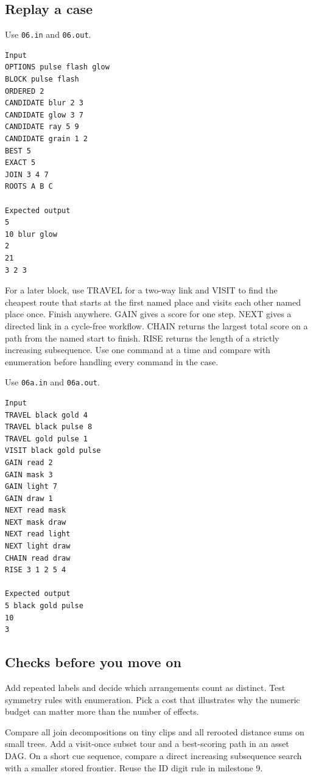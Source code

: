 \documentclass[11pt,letterpaper]{article}
\begin{document}
\subsection*{Replay a case}

Use \texttt{06.in} and \texttt{06.out}.

\begin{samepage}
\small
\begin{verbatim}
Input
OPTIONS pulse flash glow
BLOCK pulse flash
ORDERED 2
CANDIDATE blur 2 3
CANDIDATE glow 3 7
CANDIDATE ray 5 9
CANDIDATE grain 1 2
BEST 5
EXACT 5
JOIN 3 4 7
ROOTS A B C

Expected output
5
10 blur glow
2
21
3 2 3
\end{verbatim}
\end{samepage}

For a later block, use TRAVEL for a two-way link and VISIT to find the cheapest route that starts at the first named place and visits each other named place once. Finish anywhere. GAIN gives a score for one step. NEXT gives a directed link in a cycle-free workflow. CHAIN returns the largest total score on a path from the named start to finish. RISE returns the length of a strictly increasing subsequence. Use one command at a time and compare with enumeration before handling every command in the case.

Use \texttt{06a.in} and \texttt{06a.out}.

\begin{samepage}
\small
\begin{verbatim}
Input
TRAVEL black gold 4
TRAVEL black pulse 8
TRAVEL gold pulse 1
VISIT black gold pulse
GAIN read 2
GAIN mask 3
GAIN light 7
GAIN draw 1
NEXT read mask
NEXT mask draw
NEXT read light
NEXT light draw
CHAIN read draw
RISE 3 1 2 5 4

Expected output
5 black gold pulse
10
3
\end{verbatim}
\end{samepage}

\subsection*{Checks before you move on}

Add repeated labels and decide which arrangements count as distinct. Test symmetry rules with enumeration. Pick a cost that illustrates why the numeric budget can matter more than the number of effects.

Compare all join decompositions on tiny clips and all rerooted distance sums on small trees. Add a visit-once subset tour and a best-scoring path in an asset DAG. On a short cue sequence, compare a direct increasing subsequence search with a smaller stored frontier. Reuse the ID digit rule in milestone 9.
\end{document}
